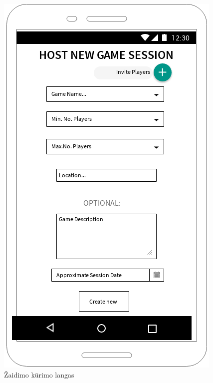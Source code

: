 \documentclass{VUMIFPSkursinis}
\begin{document}
\begin{figure}[H]
	\centering
	\includegraphics[scale=0.9]{img/host_game_window}
	\caption{Žaidimo kūrimo langas}
	\label{img:host_game_window}
\end{figure}
\end{document}
